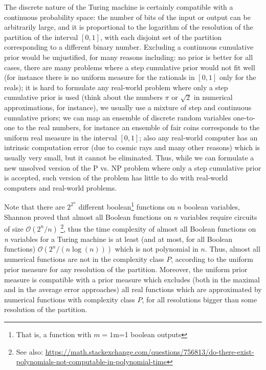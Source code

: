 \documentclass[11pt,a4paper]{report}
\begin{document}
The discrete nature of the Turing machine is certainly compatible with a
continuous probability space: the number of bits of the input or output
can be arbitrarily large, and it is proportional to the logarithm of the
resolution of the partition of the interval \([0,1]\), with each
disjoint set of the partition corresponding to a different binary
number. Excluding a continuous cumulative prior would be unjustified,
for many reasons including: no prior is better for all
cases\cite{dutchbook}, there
are many problems where a step cumulative prior would not fit well (for
instance there is no uniform measure for the rationals in \([0,1]\) only
for the reals); it is hard to formulate any real-world problem where
only a step cumulative prior is used (think about the numbers \(\pi\) or
\(\sqrt{2}\) in numerical approximations, for instance), we usually use
a mixture of step and continuous cumulative priors; we can map an
ensemble of discrete random variables one-to-one to the real numbers,
for instance an ensemble of fair coins corresponds to the uniform real
measure in the interval \([0,1]\); also any real-world computer has an
intrinsic computation error (due to cosmic rays and many other reasons)
which is usually very small, but it cannot be eliminated. Thus, while we
can formulate a new unsolved version of the P vs. NP problem where only
a step cumulative prior is accepted, such version of the problem has
little to do with real-world computers and real-world problems.

Note that there are \(2^{2^n}\) different boolean\footnote{That is, a
  function with {{\(m = 1\)}{{{}{m}{}{=}{}}{{}{1}}}} boolean outputs}
functions on \(n\) boolean variables, Shannon proved that almost all
Boolean functions on \(n\) variables require circuits of size
\(\mathcal{O}(2^n/n)\)
\cite{shannon1949synthesis}\footnote{See
  also:
  \url{https://math.stackexchange.com/questions/756813/do-there-exist-polynomials-not-computable-in-polynomial-time}},
thus the time complexity of almost all Boolean functions on \emph{n}
variables for a Turing machine is at least (and at most, for all Boolean
functions)
\(\mathcal{O}(2^n/(n\log(n)))\)\cite{10.1145/322123.322138} which is not polynomial in \(n\). Thus, almost all
numerical functions are not in the complexity class \(P\), according to
the uniform prior measure for any resolution of the partition. Moreover,
the uniform prior measure is compatible with a prior measure which
excludes (both in the maximal and in the average error approaches) all
real functions which are approximated by numerical functions with
complexity class \(P\), for all resolutions bigger than some resolution
of the partition.
\end{document}
